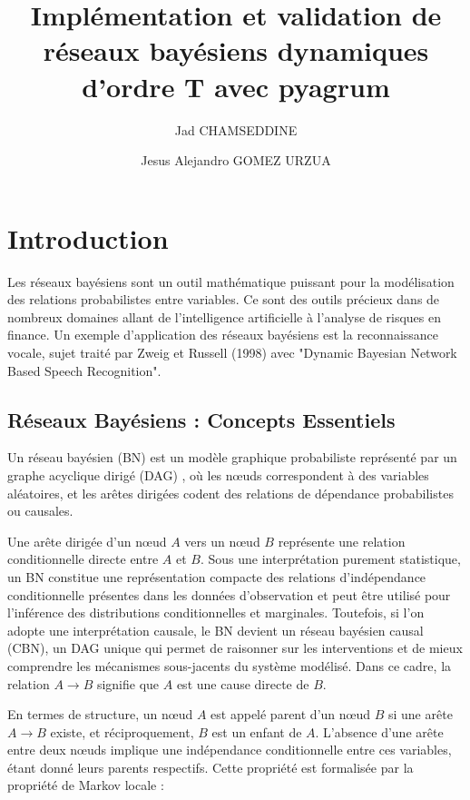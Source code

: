 \documentclass{article}
\title{Implémentation et validation de réseaux bayésiens dynamiques d'ordre T avec pyagrum}
\author{Jad CHAMSEDDINE \and Jesus Alejandro GOMEZ URZUA}
\begin{document}
\maketitle

\section{Introduction}

Les réseaux bayésiens sont un outil mathématique puissant pour la modélisation des relations
probabilistes entre variables. Ce sont des outils précieux dans de nombreux domaines allant
de l'intelligence artificielle à l'analyse de risques en finance. Un exemple d'application des
réseaux bayésiens est la reconnaissance vocale, sujet traité par Zweig et Russell (1998) avec
"Dynamic Bayesian Network Based Speech Recognition"\cite{zweig1998speech}.

\subsection{Réseaux Bayésiens : Concepts Essentiels}

Un réseau bayésien (BN) est un modèle graphique probabiliste représenté par un graphe acyclique
dirigé (DAG) \cite{mihajlovic2001dynamic}, où les nœuds correspondent à des variables aléatoires,
et les arêtes dirigées codent des relations de dépendance probabilistes ou causales.

Une arête dirigée d'un nœud $A$ vers un nœud $B$ représente une relation conditionnelle directe
entre $A$ et $B$. Sous une interprétation purement statistique, un BN constitue une représentation
compacte des relations d'indépendance conditionnelle présentes dans les données d'observation et
peut être utilisé pour l’inférence des distributions conditionnelles et marginales. Toutefois, si
l'on adopte une interprétation causale, le BN devient un réseau bayésien causal (CBN), un DAG unique
qui permet de raisonner sur les interventions et de mieux comprendre les mécanismes sous-jacents du
système modélisé. Dans ce cadre, la relation $A \to B$ signifie que $A$ est une cause directe de $B$.

En termes de structure, un nœud $A$ est appelé parent d'un nœud $B$ si une arête $A \to B$ existe,
et réciproquement, $B$ est un enfant de $A$. L'absence d'une arête entre deux nœuds implique une
indépendance conditionnelle entre ces variables, étant donné leurs parents respectifs. Cette
propriété est formalisée par la propriété de Markov locale :
\end{document}
